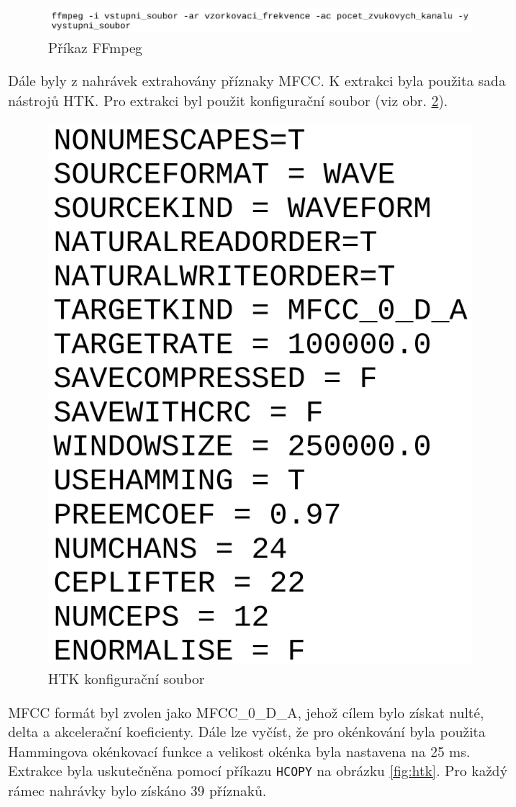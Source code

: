 \documentclass[FM,BP]{tulthesis}
\begin{document}
\begin{figure}[htbp]
\centerline{\includegraphics[width=\textwidth,height=\textheight,keepaspectratio]{ffmpeg_command.png}}
\caption{Příkaz FFmpeg}
\label{fig:ffmpeg}
\end{figure}
\FloatBarrier

Dále byly z nahrávek extrahovány příznaky MFCC. K extrakci byla použita sada nástrojů HTK. Pro extrakci byl použit konfigurační soubor (viz obr. \mbox{\ref{fig:htk_config})}.

\begin{figure}[htbp]
\centerline{\includegraphics[scale=.2,keepaspectratio]{htk_config.png}}
\caption{HTK konfigurační soubor}
\label{fig:htk_config}
\end{figure}
\FloatBarrier

MFCC formát byl zvolen jako MFCC\_0\_D\_A, jehož cílem bylo získat nulté, delta a akcelerační koeficienty. Dále lze vyčíst, že pro okénkování byla použita Hammingova okénkovací funkce a velikost okénka byla nastavena na 25 ms. Extrakce byla uskutečněna pomocí příkazu \texttt{\mbox{HCOPY}} na obrázku \mbox{\ref{fig:htk}}. Pro každý rámec nahrávky bylo získáno 39 příznaků.
\end{document}
